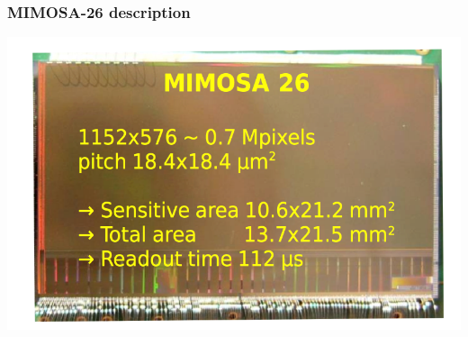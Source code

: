 \documentclass{beamer}
\begin{document}

  \begin{frame}[plain]
    \frametitle{MIMOSA-26 description}

    \begin{center}
      \includegraphics[width = \textwidth]{Pictures/mimosa26_shortDescription.png}
    \end{center}
  \end{frame}
\end{document}
